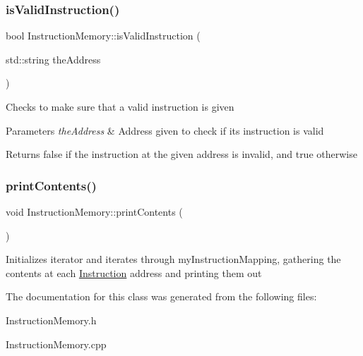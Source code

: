 \subsubsection{\texorpdfstring{is\+Valid\+Instruction()}{isValidInstruction()}}
{\footnotesize\ttfamily bool Instruction\+Memory\+::is\+Valid\+Instruction (\begin{DoxyParamCaption}\item[{std\+::string}]{the\+Address }\end{DoxyParamCaption})}

Checks to make sure that a valid instruction is given 
\begin{DoxyParams}{Parameters}
{\em the\+Address} & Address given to check if it\textquotesingle{}s instruction is valid \\
\hline
\end{DoxyParams}
\begin{DoxyReturn}{Returns}
false if the instruction at the given address is invalid, and true otherwise 
\end{DoxyReturn}
\mbox{\label{class_instruction_memory_a56a478d5ce8327bf58c9d726898921f8}} 
\subsubsection{\texorpdfstring{print\+Contents()}{printContents()}}
{\footnotesize\ttfamily void Instruction\+Memory\+::print\+Contents (\begin{DoxyParamCaption}{ }\end{DoxyParamCaption})}

Initializes iterator and iterates through my\+Instruction\+Mapping, gathering the contents at each \mbox{\hyperlink{class_instruction}{Instruction}} address and printing them out 

The documentation for this class was generated from the following files\+:\begin{DoxyCompactItemize}
\item 
Instruction\+Memory.\+h\item 
Instruction\+Memory.\+cpp\end{DoxyCompactItemize}
